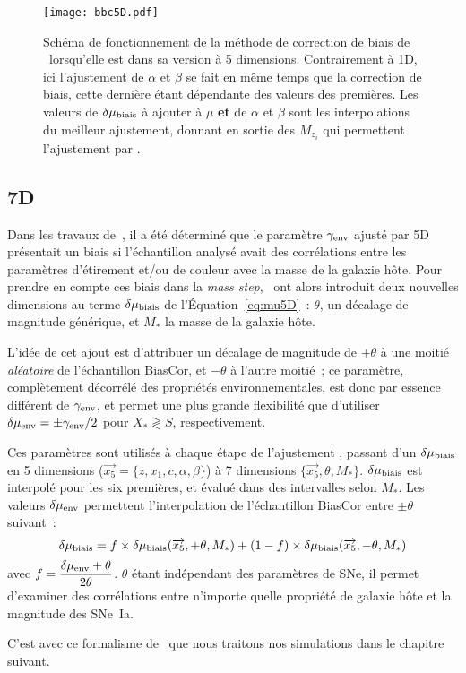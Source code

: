 \documentclass[../main/main.tex]{subfiles}
\begin{document}
\begin{figure}[]
    \centering
    \texttt{[image: bbc5D.pdf]}
    \caption[Schéma de fonctionnement de la méthode de correction de biais de
    \bbc5D]{Schéma de fonctionnement de la méthode de correction de biais de
        \bbc\ lorsqu'elle est dans sa version à 5 dimensions. Contrairement à
        \bbc1D, ici l'ajustement de $\alpha$ et $\beta$ se fait en même temps
        que la correction de biais, cette dernière étant dépendante des valeurs
        des premières. Les valeurs de $\delta\mu_{\rm biais}$ à ajouter à $\mu$
        \textbf{et} de $\alpha$ et $\beta$ sont les interpolations du meilleur
        ajustement, donnant en sortie des $M_{z_i}$ qui permettent l'ajustement
    par \wfit.}
    \label{fig:bbc5d}
\end{figure}

\subsection{\bbc7D}\label{ssec:bbc7D}

Dans les travaux de~\cite{smith2020}, il a été déterminé que le paramètre
$\gamma_{\rm env}$ ajusté par \bbc5D présentait un biais si l'échantillon
analysé avait des corrélations entre les paramètres d'étirement et/ou de couleur
avec la masse de la galaxie hôte. Pour prendre en compte ces biais dans la
\textit{mass step},~\cite{popovic2021a} ont alors introduit deux nouvelles
dimensions au terme $\delta\mu_{\rm biais}$ de l'Équation~\ref{eq:mu5D}~:
$\theta$, un décalage de magnitude générique, et $M_*$ la masse de la galaxie
hôte.

L'idée de cet ajout est d'attribuer un décalage de magnitude de $+\theta$ à une
moitié \textit{aléatoire} de l'échantillon BiasCor, et $-\theta$ à l'autre
moitié~; ce paramètre, complètement décorrélé des propriétés environnementales,
est donc par essence différent de $\gamma_{\rm env}$, et permet une plus grande
flexibilité que d'utiliser $\delta\mu_{\rm env} = \pm\gamma_{\rm env}/2$ pour
$X_* \gtrless S$, respectivement.

Ces paramètres sont utilisés à chaque étape de l'ajustement \bbc, passant d'un
$\delta\mu_{\rm biais}$ en 5 dimensions ($\overrightarrow{x_5} = \{z, x_1, c,
\alpha, \beta\}$) à 7 dimensions $\{\overrightarrow{x_5}, \theta, M_*\}$.
$\delta\mu_{\rm biais}$ est interpolé pour les six premières, et évalué dans des
intervalles selon $M_*$. Les valeurs $\delta\mu_{\rm env}$ permettent
l'interpolation de l'échantillon BiasCor entre $\pm\theta$ suivant~:
\begin{equation}
    \delta\mu_{\rm biais} =
    f\times\delta\mu_{\rm biais}(\overrightarrow{x_5}, +\theta, M_*)
    + (1-f)\times\delta\mu_{\rm biais}(\overrightarrow{x_5}, -\theta, M_*)
\end{equation}
avec $\displaystyle f = \frac{\delta\mu_{\rm env}+\theta}{2\theta}$. $\theta$ étant
indépendant des paramètres de SNe, il permet d'examiner des corrélations entre
n'importe quelle propriété de galaxie hôte et la magnitude des SNe~Ia.

C'est avec ce formalisme de \bbc\ que nous traitons nos simulations dans le
chapitre suivant.

\clearpage

\thispagestyle{plain}
\vfill
\minilof
\vfill
\minilot
\vfill

% 
% 
\end{document}
